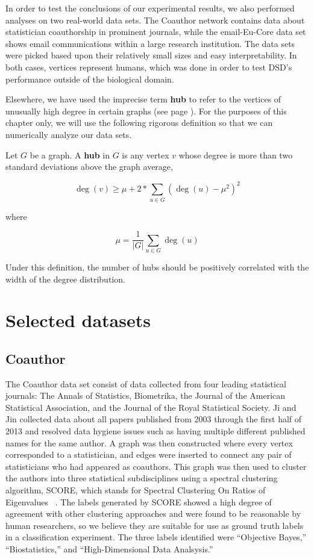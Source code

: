 In order to test the conclusions of our experimental results, we also performed analyses on two
real-world data sets. The Coauthor network contains data about statistician coauthorship in
prominent journals, while the email-Eu-Core data set shows email communications within a large
research institution. The data sets were picked based upon their relatively small sizes and easy
interpretability. In both cases, vertices represent humans, which was done in order to test DSD's
performance outside of the biological domain.

Elsewhere, we have used the imprecise term \textbf{hub} to refer to the vertices of unusually high
degree in certain graphs (see page \pageref{def:hubs}). For the purposes of this chapter only, we
will use the following rigorous definition so that we can numerically analyze our data sets.

\begin{definition}
  Let $G$ be a graph. A \textbf{hub} in $G$ is any vertex $v$ whose degree is more than two standard
  deviations above the graph average,

  \[ \deg(v) \geq \mu + 2*\sum_{u \in G}(\deg(u) - \mu^2)^2\]

  where

  \[ \mu = \frac{1}{|G|}\sum_{u \in G}\deg(u) \]
\end{definition}

Under this definition, the number of hubs should be positively correlated with the width of the
degree distribution.


\section{Selected datasets}

\subsection{Coauthor}

The Coauthor data set consist of data collected from four leading statistical journals: The Annals
of Statistics, Biometrika, the Journal of the American Statistical Association, and the Journal of
the Royal Statistical Society. Ji and Jin collected data about all papers published from 2003
through the first half of 2013 and resolved data hygiene issues such as having multiple different
published names for the same author. A graph was then constructed where every vertex corresponded to
a statistician, and edges were inserted to connect any pair of statisticians who had appeared as
coauthors. This graph was then used to cluster the authors into three statistical subdisciplines
using a spectral clustering algorithm, SCORE, which stands for Spectral Clustering On Ratios of
Eigenvalues ~\cite{ji2016}. The labels generated by SCORE showed a high degree of agreement with
other clustering approaches and were found to be reasonable by human researchers, so we believe they
are suitable for use as ground truth labels in a classification experiment. The three labels
identified were ``Objective Bayes,'' ``Biostatistics,'' and ``High-Dimensional Data Analsysis.''

